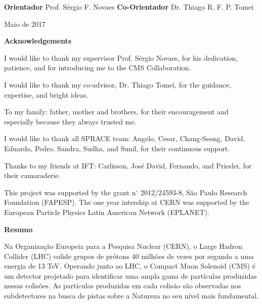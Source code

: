 \vskip 3cm
\hfill \textsf{\textbf{Orientador}}
\vskip 0.1cm
\hfill {\sf Prof. S\'ergio F. Novaes}
\vskip 1cm
\hfill \textsf{\textbf{Co-Orientador}}
\vskip 0.1cm
\hfill {\sf Dr. Thiago R. F. P. Tomei}
\vfill
\begin{center}
{\sf Maio de 2017}
\end{center}

\newpage


\begin{center}
{\LARGE \textsf{\textbf{Acknowledgements}}}
\end{center}
\vskip 2.0cm

I would like to thank my supervisor Prof. S\'ergio Novaes, for his dedication, patience, and for introducing me to the CMS Collaboration.

I would like to thank my co-advisor, Dr. Thiago Tomei, for the guidance, expertise, and bright ideas.

To my family: father, mother and brothers, for their encouragement and especially because they always trusted me.

I would like to thank all SPRACE team: Angelo, Cesar, Chang-Seong, David, Eduardo, Pedro, Sandra, Sudha, and Sunil, for their continuous support.

Thanks to my friends at IFT: Carlisson, Jos\'{e} David, Fernando, and Prieslei, for their camaraderie.

This project was supported by the grant n$^\circ$ 2012/24593-8, S\~ao Paulo Research Foundation (FAPESP). The one year intership at CERN was supported by the European Particle Physics Latin American Network (EPLANET).


\newpage

\begin{center}
{\LARGE \textsf{\textbf{Resumo}}}
\end{center}
\vskip 2.0cm

Na Organiza\c{c}\~ao Europeia para a Pesquisa Nuclear (CERN), o Large Hadron Collider (LHC) colide grupos de pr\'otons 40 milh\~oes de vezes por segundo a uma energia de 13 TeV. Operando junto ao LHC, o Compact Muon Solenoid (CMS) \'e um detector projetado para identificar uma ampla gama de part\'iculas produzidas nessas colis\~oes.  As part\'iculas produzidas em cada colis\~ao s\~ao observadas nos subdetectores na busca de pistas sobre a Natureza no seu n\'ivel mais fundamental.


